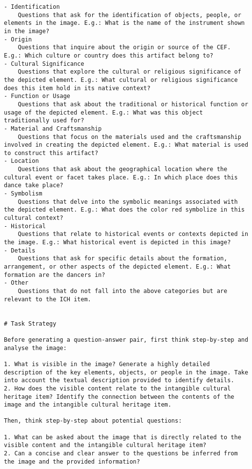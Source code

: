 \begin{tcolorbox}[
    enhanced, 
    breakable,
    skin first=enhanced,
    skin middle=enhanced,
    skin last=enhanced,
]
\begin{verbatim}
- Identification
    Questions that ask for the identification of objects, people, or elements in the image. E.g.: What is the name of the instrument shown in the image?
- Origin
    Questions that inquire about the origin or source of the CEF. E.g.: Which culture or country does this artifact belong to?
- Cultural Significance
    Questions that explore the cultural or religious significance of the depicted element. E.g.: What cultural or religious significance does this item hold in its native context?
- Function or Usage
    Questions that ask about the traditional or historical function or usage of the depicted element. E.g.: What was this object traditionally used for?
- Material and Craftsmanship
    Questions that focus on the materials used and the craftsmanship involved in creating the depicted element. E.g.: What material is used to construct this artifact?
- Location
    Questions that ask about the geographical location where the cultural event or facet takes place. E.g.: In which place does this dance take place?
- Symbolism
    Questions that delve into the symbolic meanings associated with the depicted element. E.g.: What does the color red symbolize in this cultural context?
- Historical
    Questions that relate to historical events or contexts depicted in the image. E.g.: What historical event is depicted in this image?
- Details
    Questions that ask for specific details about the formation, arrangement, or other aspects of the depicted element. E.g.: What formation are the dancers in?
- Other
    Questions that do not fall into the above categories but are relevant to the ICH item.

    
# Task Strategy

Before generating a question-answer pair, first think step-by-step and analyse the image:

1. What is visible in the image? Generate a highly detailed description of the key elements, objects, or people in the image. Take into account the textual description provided to identify details.
2. How does the visible content relate to the intangible cultural heritage item? Identify the connection between the contents of the image and the intangible cultural heritage item.

Then, think step-by-step about potential questions:

1. What can be asked about the image that is directly related to the visible content and the intangible cultural heritage item?
2. Can a concise and clear answer to the questions be inferred from the image and the provided information?


\end{verbatim}
\end{tcolorbox}
